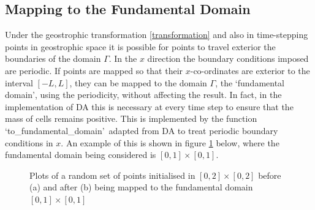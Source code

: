 \subsection{Mapping to the Fundamental Domain}

Under the geostrophic transformation \ref{transformation} and also in time-stepping points in geostrophic space it is possible for points to travel exterior the boundaries of the domain $\Gamma$. In the $x$ direction the boundary conditions imposed are periodic. If points are mapped so that their $x$-co-ordinates are exterior to the interval $[-L,L]$, they can be mapped to the domain $\Gamma$, the \textquoteleft fundamental domain\textquoteright, using the periodicity, without affecting the result.  In fact, in the implementation of DA this is necessary at every time step to ensure that the mass of cells remains positive. This is implemented by the function \textquoteleft to\_fundamental\_domain\textquoteright \ adapted from DA \cite{Merigot2017a} to treat periodic boundary conditions in $x$. An example of this is shown in figure \ref{fundamental domain} below, where the fundamental domain being considered is $[0,1]\times[0,1]$.
\begin{figure}[h!]
	\centering
	\caption{Plots of a random set of points initialised in $[0,2]\times[0,2]$ before (a) and after (b) being mapped to the fundamental domain $[0,1]\times[0,1]$}
	\label{fundamental domain}
\end{figure}
